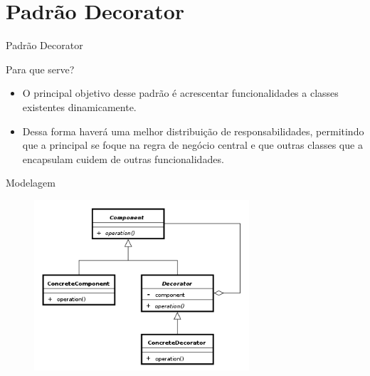 \section{Padrão Decorator}

\begin{frame}{Padrão Decorator}{}
\begin{block}{Para que serve?}
  \begin{itemize}
    \item<1-> O principal objetivo desse padrão é acrescentar funcionalidades a classes existentes dinamicamente.
    \item<1-> Dessa forma haverá uma melhor distribuição de responsabilidades, permitindo que a principal se foque na regra de negócio central e que outras classes que a encapsulam cuidem de outras funcionalidades.
  \end{itemize}
\end{block}
\end{frame}

\begin{frame}{Modelagem}
\begin{block}{}
  \begin{figure}
    \includegraphics[width=8cm]{figuras/uml_decorator}
  \end{figure}
\end{block}
\end{frame}
